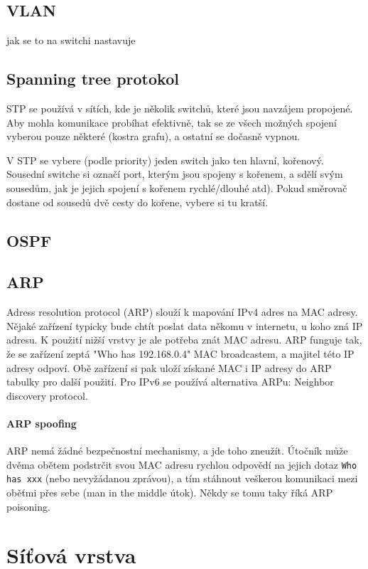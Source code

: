 \subsection{VLAN}
jak se to na switchi nastavuje

\subsection{Spanning tree protokol}

STP se používá v sítích, kde je několik switchů, které jsou navzájem propojené. Aby mohla komunikace probíhat efektivně, tak se ze všech možných spojení vyberou pouze některé (kostra grafu), a ostatní se dočasně vypnou.

V STP se vybere (podle priority) jeden switch jako ten hlavní, kořenový. Sousední switche si označí port, kterým jsou spojeny s kořenem, a sdělí svým sousedům, jak je jejich spojení s kořenem rychlé/dlouhé atd). Pokud směrovač dostane od sousedů dvě cesty do kořene, vybere si tu kratší.

\subsection{OSPF}

\subsection{ARP}

Adress resolution protocol (ARP) slouží k mapování IPv4 adres na MAC adresy. Nějaké zařízení typicky bude chtít poslat data někomu v internetu, u koho zná IP adresu. K použití nižší vrstvy je ale potřeba znát MAC adresu. ARP funguje tak, že se zařízení zeptá "Who has 192.168.0.4" MAC broadcastem, a majitel této IP adresy odpoví. Obě zařízení si pak uloží získané MAC i IP adresy do ARP tabulky pro další použití. Pro IPv6 se používá alternativa ARPu: Neighbor discovery protocol.

\paragraph{ARP spoofing} ARP nemá žádné bezpečnostní mechanismy, a jde toho zneužít. Útočník může dvěma obětem podstrčit svou MAC adresu rychlou odpovědí na jejich dotaz \texttt{Who has xxx} (nebo nevyžádanou zprávou), a tím stáhnout veškerou komunikaci mezi oběťmi přes sebe (man in the middle útok). Někdy se tomu taky říká ARP poisoning.


\section{Síťová vrstva}

